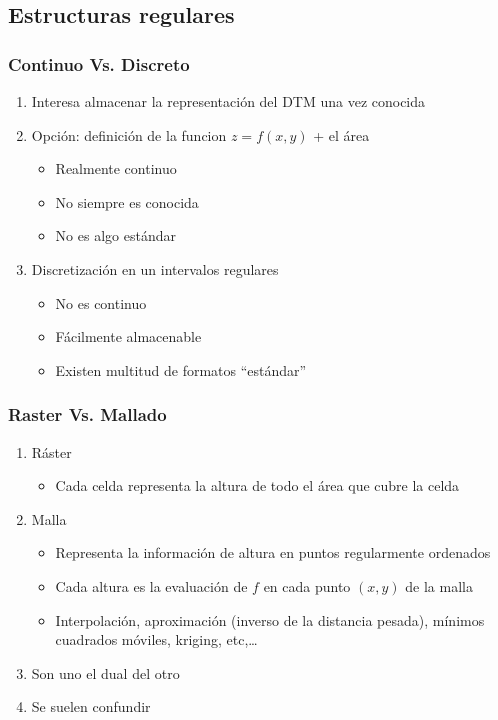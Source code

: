 \subsection[Ráster]{Estructuras regulares}
\begin{frame}
  \frametitle{Continuo Vs. Discreto}
  \begin{enumerate}
    \item Interesa almacenar la representación del DTM una vez conocida
    \item Opción: definición de la funcion $z = f(x,y)$ + el área
      \begin{itemize}
        \item[\tickYes] Realmente continuo
        \item[\tickNo] No siempre es conocida
        \item[\tickNo] No es algo estándar
      \end{itemize}
    \item Discretización en un intervalos regulares
      \begin{itemize}
        \item[\tickNo] No es continuo
        \item[\tickYes] Fácilmente almacenable
        \item[\tickYes] Existen multitud de formatos ``estándar''
      \end{itemize}
  \end{enumerate}
\end{frame}
\begin{frame}
  \frametitle{Raster Vs. Mallado}
  \begin{enumerate}
    \item \alert{Ráster} 
      \begin{itemize}
        \item Cada celda representa la altura de todo el área que cubre la celda
      \end{itemize}
    \item \alert{Malla}
      \begin{itemize}
        \item Representa la información de altura en puntos regularmente ordenados
        \item Cada altura es la evaluación de $f$ en cada punto $(x,y)$ de la
          malla
        \item Interpolación, aproximación (inverso de la distancia pesada),
          mínimos cuadrados móviles, kriging, etc,\ldots
      \end{itemize}
    \item Son uno el dual del otro
    \item Se suelen confundir
  \end{enumerate}
\end{frame}

